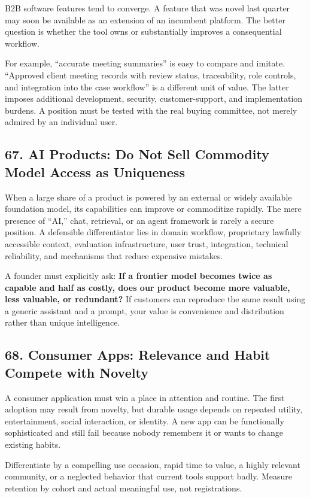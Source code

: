 B2B software features tend to converge. A feature that was novel last quarter may soon be available as an extension of an incumbent platform. The better question is whether the tool owns or substantially improves a consequential workflow.

For example, ``accurate meeting summaries'' is easy to compare and imitate. ``Approved client meeting records with review status, traceability, role controls, and integration into the case workflow'' is a different unit of value. The latter imposes additional development, security, customer-support, and implementation burdens. A position must be tested with the real buying committee, not merely admired by an individual user.

\subsection*{67. AI Products: Do Not Sell Commodity Model Access as Uniqueness}

When a large share of a product is powered by an external or widely available foundation model, its capabilities can improve or commoditize rapidly. The mere presence of ``AI,'' chat, retrieval, or an agent framework is rarely a secure position. A defensible differentiator lies in domain workflow, proprietary lawfully accessible context, evaluation infrastructure, user trust, integration, technical reliability, and mechanisms that reduce expensive mistakes.

A founder must explicitly ask: \textbf{If a frontier model becomes twice as capable and half as costly, does our product become more valuable, less valuable, or redundant?} If customers can reproduce the same result using a generic assistant and a prompt, your value is convenience and distribution rather than unique intelligence.

\subsection*{68. Consumer Apps: Relevance and Habit Compete with Novelty}

A consumer application must win a place in attention and routine. The first adoption may result from novelty, but durable usage depends on repeated utility, entertainment, social interaction, or identity. A new app can be functionally sophisticated and still fail because nobody remembers it or wants to change existing habits.

Differentiate by a compelling use occasion, rapid time to value, a highly relevant community, or a neglected behavior that current tools support badly. Measure retention by cohort and actual meaningful use, not registrations.

